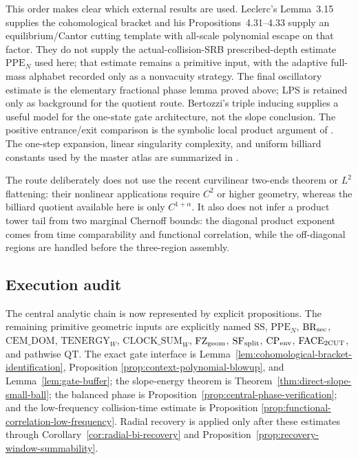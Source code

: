 \documentclass[11pt]{article}
\begin{document}
This order makes clear which external results are used.  Leclerc's
Lemma~3.15 supplies the cohomological bracket and his
Propositions~4.31--4.33 supply an equilibrium/Cantor cutting template with
all-scale polynomial escape on that factor.  They do not supply the
actual-collision-SRB prescribed-depth estimate $\mathrm{PPE}_{N}$ used here;
that estimate remains a primitive input, with the adaptive full-mass alphabet
recorded only as a nonvacuity strategy.
The final oscillatory estimate is the elementary fractional phase lemma
proved above; LPS is retained only as background for the quotient route.
Bertozzi's triple inducing supplies a useful model for the one-state gate
architecture, not the slope conclusion.  The positive entrance/exit comparison is the symbolic local
product argument of \cite{ClimenhagaLPS}.  The
one-step expansion, linear singularity complexity, and uniform billiard
constants used by the master atlas are summarized in \cite{DLreview}.

The route deliberately does not use the recent curvilinear two-ends theorem
or $L^2$ flattening: their nonlinear applications require $C^2$ or higher
geometry, whereas the billiard quotient available here is only
$C^{1+\alpha}$.  It also does not infer a product tower tail from two
marginal Chernoff bounds: the diagonal product exponent comes from time
comparability and functional correlation, while the off-diagonal regions are
handled before the three-region assembly.

\subsection{Execution audit}

The central analytic chain is now represented by explicit propositions.
The remaining primitive geometric inputs are explicitly named
$\mathrm{SS}$, $\mathrm{PPE}_{N}$, $\mathrm{BR}_{\rm sec}$,
$\mathrm{CEM\_DOM}$, $\mathrm{TENERGY}_{W}$,
$\mathrm{CLOCK\_SUM}_{W}$, $\mathrm{FZ}_{\rm geom}$,
$\mathrm{SF}_{\rm split}$, $\mathrm{CP}_{\rm env}$,
$\mathrm{FACE}_{\rm 2CUT}$, and pathwise
$\mathrm{QT}$.  The exact gate interface is
Lemma~\ref{lem:cohomological-bracket-identification}, Proposition
\ref{prop:context-polynomial-blowup}, and Lemma~\ref{lem:gate-buffer}; the
slope-energy theorem is Theorem~\ref{thm:direct-slope-small-ball}; the
balanced phase is Proposition~\ref{prop:central-phase-verification}; and the
low-frequency collision-time estimate is Proposition
\ref{prop:functional-correlation-low-frequency}.  Radial recovery is applied
only after these estimates through Corollary~\ref{cor:radial-bi-recovery} and
Proposition~\ref{prop:recovery-window-summability}.
\end{document}
